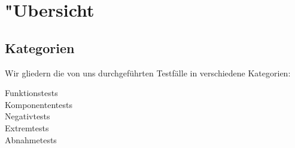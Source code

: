 %



\section{{"U}bersicht}
\label{Abschnitt:Tests:Uebersicht}



\subsection{Kategorien}
\label{Abschnitt:Tests:Uebersicht:Kategorien}

Wir gliedern die von uns durchgeführten Testfälle in verschiedene Kategorien:

\begin{description} %

	\item[Funktionstests]
	\item[Komponententests]
	\item[Negativtests]
	\item[Extremtests]
	\item[Abnahmetests]

\end{description}










